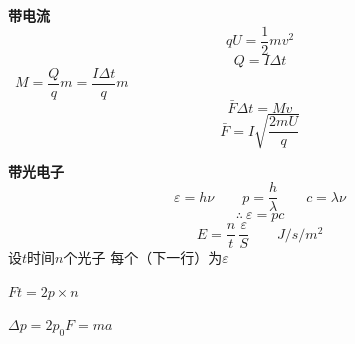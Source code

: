 \textbf{带电流}
\[
qU=\frac{1}{2}mv^{2}
\]
\[
Q=I\Delta t
\]
\ $M=\dfrac{Q}{q}m=\dfrac{I\Delta t}{q}m$
\[
\bar F\Delta t=Mv
\]
\[
\bar F=I\sqrt{\frac{2mU}{q}}
\]

\textbf{带光电子} %
\[
\varepsilon=h\nu\qquad p=\frac{h}{\lambda}\qquad c=\lambda\nu
\]
\[
\therefore\ \varepsilon=pc
\]
\[
E=\frac{n}{t}\,\frac{\varepsilon}{S}\qquad \unit{J/s/m^{2}}
\]
设$t$时间$n$个光子 每个（下一行）为$\varepsilon$ %

\quad $Ft=2p\times n$

$\Delta p=2p_0$\quad $F=ma$
